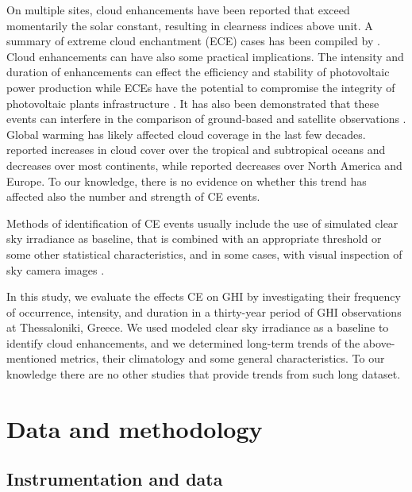 \documentclass[preprint, 5p,
authoryear]{elsarticle} %
\begin{document}
On multiple sites, cloud enhancements have been reported that exceed
momentarily the solar constant, resulting in clearness indices above
unit. A summary of extreme cloud enchantment (ECE) cases has been
compiled by \citet{Martins2022}. Cloud enhancements can have also some
practical implications. The intensity and duration of enhancements can
effect the efficiency and stability of photovoltaic power production
\citep{Lappalainen2020, Jaervelae2020} while ECEs have the potential to
compromise the integrity of photovoltaic plants infrastructure
\citep{DoNascimento2019}. It has also been demonstrated that these
events can interfere in the comparison of ground-based and satellite
observations \citep{Damiani2018}. Global warming has likely affected
cloud coverage in the last few decades. \citet{Liu2023} reported
increases in cloud cover over the tropical and subtropical oceans and
decreases over most continents, while \citet{Dong2023} reported
decreases over North America and Europe. To our knowledge, there is no
evidence on whether this trend has affected also the number and strength
of CE events.

Methods of identification of CE events usually include the use of
simulated clear sky irradiance as baseline, that is combined with an
appropriate threshold or some other statistical characteristics, and in
some cases, with visual inspection of sky camera images \citep[ and
references therein]{Vamvakas2020, Mol2023}.

In this study, we evaluate the effects CE on GHI by investigating their
frequency of occurrence, intensity, and duration in a thirty-year period
of GHI observations at Thessaloniki, Greece. We used modeled clear sky
irradiance as a baseline to identify cloud enhancements, and we
determined long-term trends of the above-mentioned metrics, their
climatology and some general characteristics. To our knowledge there are
no other studies that provide trends from such long dataset.

\section{Data and methodology}\label{data-and-methodology}

\subsection{Instrumentation and data}\label{instrumentation-and-data}
\end{document}
